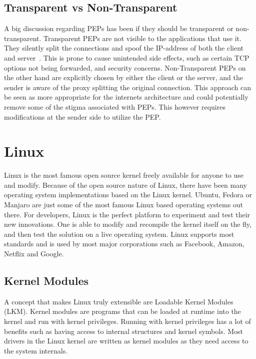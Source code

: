 \documentclass[a4paper,english, 12pt]{report}
\begin{document}
\subsection{Transparent vs Non-Transparent}
A big discussion regarding PEPs has been if they should be transparent or non-transparent. Transparent PEPs are not visible to the applications that use it. They silently split the connections and spoof the IP-address of both the client and server~\cite{pep_dna}. This is prone to cause unintended side effects, such as certain TCP options not being forwarded, and security concerns. Non-Transparent PEPs on the other hand are explicitly chosen by either the client or the server, and the sender is aware of the proxy splitting the original connection. This approach can be seen as more appropriate for the internets architecture and could potentially remove some of the stigma associated with PEPs. This however requires modifications at the sender side to utilize the PEP.

\section{Linux}

Linux is the most famous open source kernel freely available for anyone to use and modify. Because of the open source nature of Linux, there have been many operating system implementations based on the Linux kernel. Ubuntu, Fedora or Manjaro are just some of the most famous Linux based operating systems out there. For developers, Linux is the perfect platform to experiment and test their new innovations. One is able to modify and recompile the kernel itself on the fly, and then test the solution on a live operating system. Linux supports most standards and is used by most major corporations such as Facebook, Amazon, Netflix and Google.

\subsection{Kernel Modules}
A concept that makes Linux truly extensible are Loadable Kernel Modules (LKM). Kernel modules are programs that can be loaded at runtime into the kernel and run with kernel privileges. Running with kernel privileges has a lot of benefits such as having access to internal structures and kernel symbols. Most drivers in the Linux kernel are written as kernel modules as they need access to the system internals.\\
\end{document}
